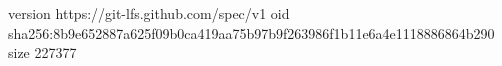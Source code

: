 version https://git-lfs.github.com/spec/v1
oid sha256:8b9e652887a625f09b0ca419aa75b97b9f263986f1b11e6a4e1118886864b290
size 227377
